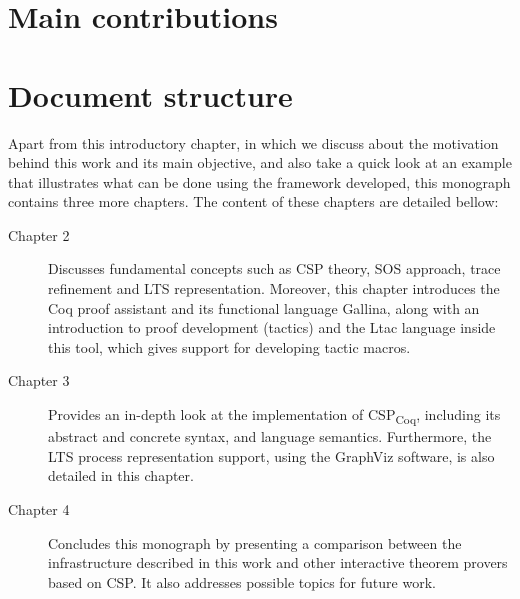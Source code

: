 \section{Main contributions}

\section{Document structure}

Apart from this introductory chapter, in which we discuss about the motivation behind this work and its main objective, and also take a quick look at an example that illustrates what can be done using the framework developed, this monograph contains three more chapters. The content of these chapters are detailed bellow:
\begin{description}
	\item [Chapter 2] Discusses fundamental concepts such as CSP theory, SOS approach, trace refinement and LTS representation. Moreover, this chapter introduces the Coq proof assistant and its functional language Gallina, along with an introduction to proof development (tactics) and the Ltac language inside this tool, which gives support for developing tactic macros.
	\item [Chapter 3] Provides an in-depth look at the implementation of CSP\textsubscript{Coq}, including its abstract and concrete syntax, and language semantics. Furthermore, the LTS process representation support, using the GraphViz software, is also detailed in this chapter.
	\item [Chapter 4] Concludes this monograph by presenting a comparison between the infrastructure described in this work and other interactive theorem provers based on CSP. It also addresses possible topics for future work.
\end{description}
